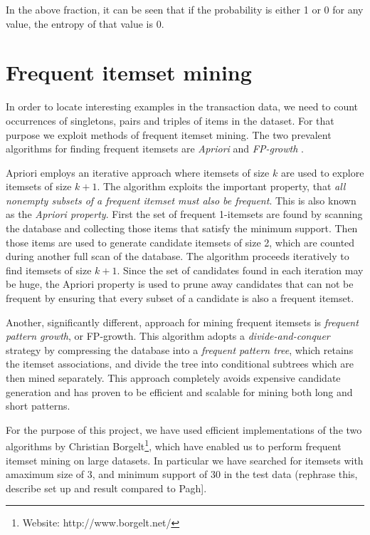 \documentclass{acm_proc_article-sp}
\begin{document}
In the above fraction, it can be seen that if the probability is either 1 or 0 for any value, the entropy of that value is 0. 

\section{Frequent itemset mining}

In order to locate interesting examples in the transaction data, we need to count occurrences of singletons, pairs and triples of items in the dataset. For that purpose we exploit methods of frequent itemset mining. The two prevalent algorithms for finding frequent itemsets are \emph{Apriori} and \emph{FP-growth} \cite{datamining}.

Apriori employs an iterative approach where itemsets of size $k$ are used to explore itemsets of size $k+1$. The algorithm exploits the important property, that \emph{all nonempty subsets of a frequent itemset must also be frequent}. This is also known as the \emph{Apriori property}. First the set of frequent 1-itemsets are found by scanning the database and collecting those items that satisfy the minimum support. Then those items are used to generate candidate itemsets of size 2, which are counted during another full scan of the database. The algorithm proceeds iteratively to find itemsets of size $k+1$. Since the set of candidates found in each iteration may be huge, the Apriori property is used to prune away candidates that can not be frequent by ensuring that every subset of a candidate is also a frequent itemset.

Another, significantly different, approach for mining frequent itemsets is \emph{frequent pattern growth}, or FP-growth. This algorithm adopts a \emph{divide-and-conquer} strategy by compressing the database into a \emph{frequent pattern tree}, which retains the itemset associations, and divide the tree into conditional subtrees which are then mined separately. This approach completely avoids expensive candidate generation and has proven to be efficient and scalable for mining both long and short patterns. 



For the purpose of this project, we have used efficient implementations of the two algorithms by Christian Borgelt\footnote{Website: http://www.borgelt.net/}, which have enabled us to perform frequent itemset mining on large datasets. In particular we have searched for itemsets with amaximum size of 3, and minimum support of 30 in the test data (rephrase this, describe set up and result compared to Pagh]. 
\end{document}

